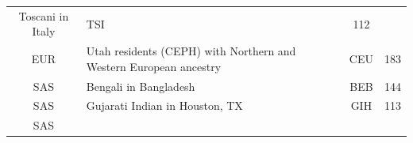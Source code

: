 \documentclass[]{book}
\begin{document}
\begin{longtable}[]{@{}clcc@{}}
\begin{minipage}[t]{0.59\columnwidth}
Toscani in Italy\strut
\end{minipage} & \begin{minipage}[t]{0.09\columnwidth}\centering\strut
TSI\strut
\end{minipage} & \begin{minipage}[t]{0.07\columnwidth}\centering\strut
112\strut
\end{minipage}\tabularnewline
\begin{minipage}[t]{0.14\columnwidth}\centering\strut
EUR\strut
\end{minipage} & \begin{minipage}[t]{0.59\columnwidth}\raggedright\strut
Utah residents (CEPH) with Northern and Western European ancestry\strut
\end{minipage} & \begin{minipage}[t]{0.09\columnwidth}\centering\strut
CEU\strut
\end{minipage} & \begin{minipage}[t]{0.07\columnwidth}\centering\strut
183\strut
\end{minipage}\tabularnewline
\begin{minipage}[t]{0.14\columnwidth}\centering\strut
SAS\strut
\end{minipage} & \begin{minipage}[t]{0.59\columnwidth}\raggedright\strut
Bengali in Bangladesh\strut
\end{minipage} & \begin{minipage}[t]{0.09\columnwidth}\centering\strut
BEB\strut
\end{minipage} & \begin{minipage}[t]{0.07\columnwidth}\centering\strut
144\strut
\end{minipage}\tabularnewline
\begin{minipage}[t]{0.14\columnwidth}\centering\strut
SAS\strut
\end{minipage} & \begin{minipage}[t]{0.59\columnwidth}\raggedright\strut
Gujarati Indian in Houston, TX\strut
\end{minipage} & \begin{minipage}[t]{0.09\columnwidth}\centering\strut
GIH\strut
\end{minipage} & \begin{minipage}[t]{0.07\columnwidth}\centering\strut
113\strut
\end{minipage}\tabularnewline
\begin{minipage}[t]{0.14\columnwidth}\centering\strut
SAS\strut

\end{minipage}
\end{longtable}
\end{document}

